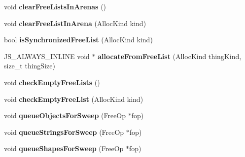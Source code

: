 \begin{DoxyCompactItemize}
\item 
\hypertarget{structjs_1_1gc_1_1_arena_lists_a89729b461c0c076aa213235a0362ce43}{void {\bfseries clear\-Free\-Lists\-In\-Arenas} ()}\label{structjs_1_1gc_1_1_arena_lists_a89729b461c0c076aa213235a0362ce43}

\item 
\hypertarget{structjs_1_1gc_1_1_arena_lists_a5665416dfa4fcbe193875a3d5b97104b}{void {\bfseries clear\-Free\-List\-In\-Arena} (Alloc\-Kind kind)}\label{structjs_1_1gc_1_1_arena_lists_a5665416dfa4fcbe193875a3d5b97104b}

\item 
\hypertarget{structjs_1_1gc_1_1_arena_lists_abfa459afb496d3a933aae30b61bf144a}{bool {\bfseries is\-Synchronized\-Free\-List} (Alloc\-Kind kind)}\label{structjs_1_1gc_1_1_arena_lists_abfa459afb496d3a933aae30b61bf144a}

\item 
\hypertarget{structjs_1_1gc_1_1_arena_lists_a5e5068c5bf938fa0d353357346f8f813}{J\-S\-\_\-\-A\-L\-W\-A\-Y\-S\-\_\-\-I\-N\-L\-I\-N\-E void $\ast$ {\bfseries allocate\-From\-Free\-List} (Alloc\-Kind thing\-Kind, size\-\_\-t thing\-Size)}\label{structjs_1_1gc_1_1_arena_lists_a5e5068c5bf938fa0d353357346f8f813}

\item 
\hypertarget{structjs_1_1gc_1_1_arena_lists_afc3cb6a486b25d600540a20f642cf647}{void {\bfseries check\-Empty\-Free\-Lists} ()}\label{structjs_1_1gc_1_1_arena_lists_afc3cb6a486b25d600540a20f642cf647}

\item 
\hypertarget{structjs_1_1gc_1_1_arena_lists_ab99e8daf49154a45cddc6cdb3bb127e2}{void {\bfseries check\-Empty\-Free\-List} (Alloc\-Kind kind)}\label{structjs_1_1gc_1_1_arena_lists_ab99e8daf49154a45cddc6cdb3bb127e2}

\item 
\hypertarget{structjs_1_1gc_1_1_arena_lists_a85795dd0d897728df9ad9f9f3b2f4166}{void {\bfseries queue\-Objects\-For\-Sweep} (Free\-Op $\ast$fop)}\label{structjs_1_1gc_1_1_arena_lists_a85795dd0d897728df9ad9f9f3b2f4166}

\item 
\hypertarget{structjs_1_1gc_1_1_arena_lists_a53ca5d52c4193f985f757d93f2a51192}{void {\bfseries queue\-Strings\-For\-Sweep} (Free\-Op $\ast$fop)}\label{structjs_1_1gc_1_1_arena_lists_a53ca5d52c4193f985f757d93f2a51192}

\item 
\hypertarget{structjs_1_1gc_1_1_arena_lists_a9153098ba815c8303a4e96e60bb72b52}{void {\bfseries queue\-Shapes\-For\-Sweep} (Free\-Op $\ast$fop)}\label{structjs_1_1gc_1_1_arena_lists_a9153098ba815c8303a4e96e60bb72b52}


\end{DoxyCompactItemize}
